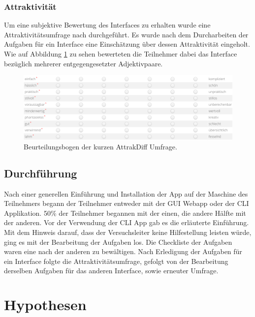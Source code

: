 \documentclass[oneside,bibliography=totocnumbered,BCOR=5mm]{scrbook}
\begin{document}
\subsubsection{Attraktivität}

Um eine subjektive Bewertung des Interfaces zu erhalten wurde eine
Attraktivitätsumfrage nach \textcite{attrakdiff} durchgeführt. Es wurde nach
dem Durcharbeiten der Aufgaben für ein Interface eine Einschätzung über
dessen Attraktivität eingeholt. Wie auf Abbildung \ref{fig:survey-values}
zu sehen bewerteten die Teilnehmer dabei das Interface bezüglich mehrerer
entgegengesetzter Adjektivpaare.

\begin{figure}[H]
  \centering
  \includegraphics[scale=0.42]{survey-values.png}
  \caption{Beurteilungsbogen der kurzen AttrakDiff Umfrage.}
  \label{fig:survey-values}
\end{figure}

\subsection{Durchführung}

Nach einer generellen Einführung und Installation der App auf der Maschine des
Teilnehmers begann der Teilnehmer entweder mit der GUI Webapp oder der CLI
Applikation. 50\% der Teilnehmer begannen mit der einen, die andere Hälfte mit
der anderen. Vor der Verwendung der CLI App gab es die erläuterte Einführung.
Mit dem Hinweis darauf, dass der Versuchsleiter keine Hilfestellung leisten
würde, ging es mit der Bearbeitung der Aufgaben los. Die Checkliste der Aufgaben
waren eine nach der anderen zu bewältigen. Nach Erledigung der Aufgaben für
ein Interface folgte die Attraktivitätsumfrage, gefolgt von der Bearbeitung
derselben Aufgaben für das anderen Interface, sowie erneuter Umfrage.

\section{Hypothesen}

\newcommand{\hypodef}[1]{
  \medskip
  \medskip
  \fbox{\parbox{\linewidth}{
    \refstepcounter{hypo}
    Hypothese~\thehypo: #1
    \label{hypo:\thehypo}
  }}
}
\newcommand{\hyporef}[2]{
  \medskip
  \fbox{\parbox{\linewidth}{
    \hyperref[hypo:#1]{Hypothese~#1}: #2
  }}
}
\end{document}

